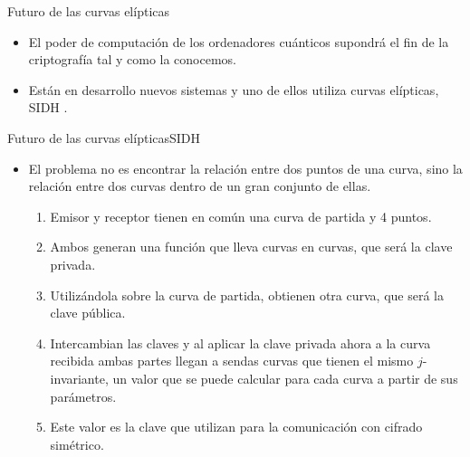 \documentclass[spanish]{beamer}
\begin{document}
\begin{frame}[fragile]{Futuro de las curvas elípticas}
  \begin{itemize}
    \item El poder de computación de los ordenadores cuánticos supondrá el fin de la criptografía tal y como la conocemos.
    \item Están en desarrollo nuevos sistemas \parencite{computer_security_division_call_2017} y uno de ellos utiliza curvas elípticas, SIDH \parencite{yang_towards_2011}.
  \end{itemize}
\end{frame}

\begin{frame}[fragile]{Futuro de las curvas elípticas}{SIDH}
  \begin{itemize}
    \item El problema no es encontrar la relación entre dos puntos de una curva, sino la relación entre dos curvas dentro de un gran conjunto de ellas.
    \begin{enumerate}
      \item Emisor y receptor tienen en común una curva de partida y 4 puntos.
      \item Ambos generan una función que lleva curvas en curvas, que será la clave privada.
      \item Utilizándola sobre la curva de partida, obtienen otra curva, que será la clave pública.
      \item Intercambian las claves y al aplicar la clave privada ahora a la curva recibida ambas partes llegan a sendas curvas que tienen el mismo \(j\)-invariante, un valor que se puede calcular para cada curva a partir de sus parámetros.
      \item Este valor es la clave que utilizan para la comunicación con cifrado simétrico.
    \end{enumerate}
  \end{itemize}
\end{frame}


\begin{frame}
  \printbibliography
\end{frame}
\end{document}
